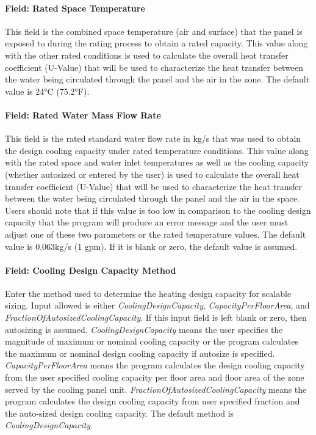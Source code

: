 \paragraph{Field: Rated Space Temperature}\label{field-rated-space-temperature}

This field is the combined space temperature (air and surface) that the panel is exposed to during the rating process to obtain a rated capacity.  This value along with the other rated conditions is used to calculate the overall heat transfer coefficient (U-Value) that will be used to characterize the heat transfer between the water being circulated through the panel and the air in the zone.  The default value is 24°C (75.2°F).

\paragraph{Field: Rated Water Mass Flow Rate}\label{field-rated-water-mass-flow-rate}

This field is the rated standard water flow rate in kg/s that was used to obtain the design cooling capacity under rated temperature conditions.  This value along with the rated space and water inlet temperatures as well as the cooling capacity (whether autosized or entered by the user) is used to calculate the overall heat transfer coefficient (U-Value) that will be used to characterize the heat transfer between the water being circulated through the panel and the air in the space.  Users should note that if this value is too low in comparison to the cooling design capacity that the program will produce an error message and the user must adjust one of these two parameters or the rated temperature values.  The default value is 0.063kg/s (1 gpm).  If it is blank or zero, the default value is assumed.

\paragraph{Field: Cooling Design Capacity Method}\label{field-cooling-design-capacity-method-2}

Enter the method used to determine the heating design capacity for scalable sizing. Input allowed is either \emph{CoolingDesignCapacity}, \emph{CapacityPerFloorArea}, and \emph{FractionOfAutosizedCoolingCapacity}. If this input field is left blank or zero, then autosizing is assumed. \emph{CoolingDesignCapacity} means the user specifies the magnitude of maximum or nominal cooling capacity or the program calculates the maximum or nominal design cooling capacity if autosize is specified. \emph{CapacityPerFloorArea} means the program calculates the design cooling capacity from the user specified cooling capacity per floor area and floor area of the zone served by the cooling panel unit. \emph{FractionOfAutosizedCoolingCapacity} means the program calculates the design cooling capacity from user specified fraction and the auto-sized design cooling capacity. The default method is \emph{CoolingDesignCapacity}.


